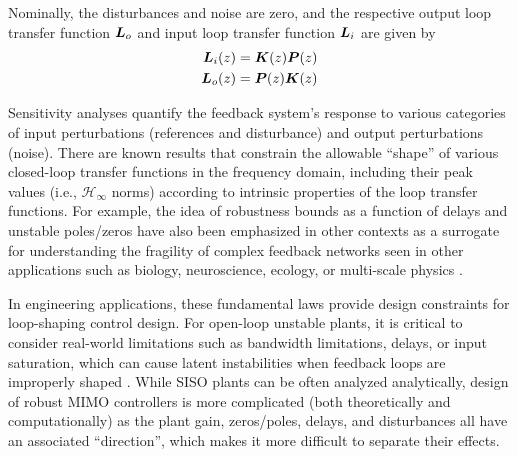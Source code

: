 Nominally, the disturbances and noise are zero, and the respective output loop transfer function $\vb*{L}_{o}$ and input loop transfer function $\vb*{L}_{i}$ are given by
\begin{subequations}
\label{eq:input_output_sensitivities}
\begin{align}
	\vb*{L}_{i}(z) = \vb*{K}(z)\vb*{P}(z) \label{eq:input_loop_transfer}\\
	\vb*{L}_{o}(z) = \vb*{P}(z)\vb*{K}(z) \label{eq:output_loop_transfer} 
\end{align}
\end{subequations}

Sensitivity analyses quantify the feedback system's response to various categories of input perturbations (references and disturbance) and output perturbations (noise).  There are known results that constrain the allowable ``shape'' of various closed-loop transfer functions in the frequency domain, including their peak values (i.e., $\mathcal{H}_{\infty}$ norms) according to intrinsic properties of the loop transfer functions.  For example, the idea of robustness bounds as a function of delays and unstable poles/zeros have also been emphasized in other contexts as a surrogate for understanding the fragility of complex feedback networks seen in other applications such as biology, neuroscience, ecology, or multi-scale physics \cite{doyle2011universal, leong2016understanding, doyle2017universal}.

In engineering applications, these fundamental laws provide design constraints for loop-shaping control design.  For open-loop unstable plants, it is critical to consider real-world limitations such as bandwidth limitations, delays, or input saturation, which can cause latent instabilities when feedback loops are improperly shaped \cite{stein2003respect}.  While SISO plants can be often analyzed analytically, design of robust MIMO controllers is more complicated (both theoretically and computationally) as the plant gain, zeros/poles, delays, and disturbances all have an associated ``direction'', which makes it more difficult to separate their effects.

